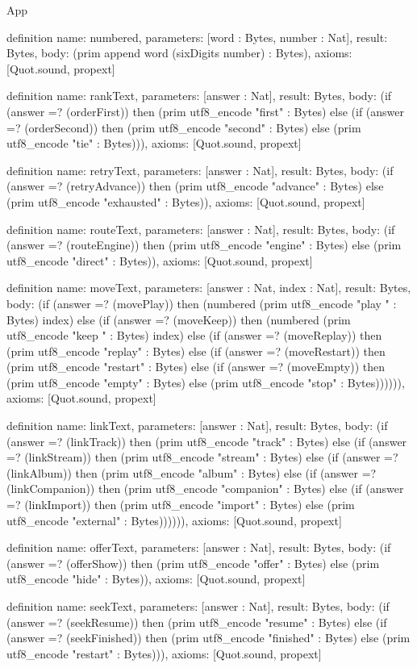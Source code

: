 \begin{lexlean}{App}
\begin{semanticmodule}
definition{
  name: numbered,
  parameters: [word : Bytes, number : Nat],
  result: Bytes,
  body: (prim append word (sixDigits number) : Bytes),
  axioms: [Quot.sound, propext]
}

definition{
  name: rankText,
  parameters: [answer : Nat],
  result: Bytes,
  body: (if (answer =? (orderFirst)) then (prim utf8_encode "first" : Bytes) else (if (answer =? (orderSecond)) then (prim utf8_encode "second" : Bytes) else (prim utf8_encode "tie" : Bytes))),
  axioms: [Quot.sound, propext]
}

definition{
  name: retryText,
  parameters: [answer : Nat],
  result: Bytes,
  body: (if (answer =? (retryAdvance)) then (prim utf8_encode "advance" : Bytes) else (prim utf8_encode "exhausted" : Bytes)),
  axioms: [Quot.sound, propext]
}

definition{
  name: routeText,
  parameters: [answer : Nat],
  result: Bytes,
  body: (if (answer =? (routeEngine)) then (prim utf8_encode "engine" : Bytes) else (prim utf8_encode "direct" : Bytes)),
  axioms: [Quot.sound, propext]
}

definition{
  name: moveText,
  parameters: [answer : Nat, index : Nat],
  result: Bytes,
  body: (if (answer =? (movePlay)) then (numbered (prim utf8_encode "play " : Bytes) index) else (if (answer =? (moveKeep)) then (numbered (prim utf8_encode "keep " : Bytes) index) else (if (answer =? (moveReplay)) then (prim utf8_encode "replay" : Bytes) else (if (answer =? (moveRestart)) then (prim utf8_encode "restart" : Bytes) else (if (answer =? (moveEmpty)) then (prim utf8_encode "empty" : Bytes) else (prim utf8_encode "stop" : Bytes)))))),
  axioms: [Quot.sound, propext]
}

definition{
  name: linkText,
  parameters: [answer : Nat],
  result: Bytes,
  body: (if (answer =? (linkTrack)) then (prim utf8_encode "track" : Bytes) else (if (answer =? (linkStream)) then (prim utf8_encode "stream" : Bytes) else (if (answer =? (linkAlbum)) then (prim utf8_encode "album" : Bytes) else (if (answer =? (linkCompanion)) then (prim utf8_encode "companion" : Bytes) else (if (answer =? (linkImport)) then (prim utf8_encode "import" : Bytes) else (prim utf8_encode "external" : Bytes)))))),
  axioms: [Quot.sound, propext]
}

definition{
  name: offerText,
  parameters: [answer : Nat],
  result: Bytes,
  body: (if (answer =? (offerShow)) then (prim utf8_encode "offer" : Bytes) else (prim utf8_encode "hide" : Bytes)),
  axioms: [Quot.sound, propext]
}

definition{
  name: seekText,
  parameters: [answer : Nat],
  result: Bytes,
  body: (if (answer =? (seekResume)) then (prim utf8_encode "resume" : Bytes) else (if (answer =? (seekFinished)) then (prim utf8_encode "finished" : Bytes) else (prim utf8_encode "restart" : Bytes))),
  axioms: [Quot.sound, propext]
}


\end{semanticmodule}
\end{lexlean}
